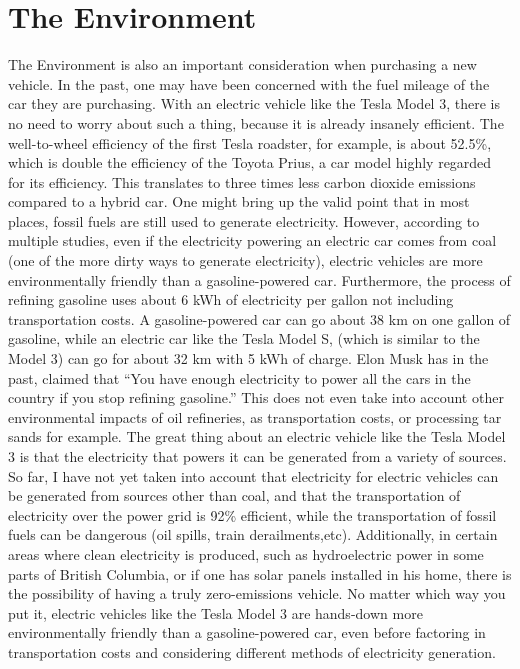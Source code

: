 \documentclass{IEEEtran}
\begin{document}
  \section{The Environment}
  The Environment is also an important consideration when purchasing a new vehicle.
  In the past, one may have been concerned with the fuel mileage of the car they are purchasing.
  With an electric vehicle like the Tesla Model 3, there is no need to worry about such a thing,
  because it is already insanely efficient. The well-to-wheel efficiency of the first Tesla roadster,
  for example, is about 52.5\%, which is double the efficiency of the Toyota Prius\cite{eberhard200621},
  a car model highly regarded for its efficiency. This translates to three times less carbon dioxide
  emissions compared to a hybrid car.\cite{eberhard200621} One might bring up the valid point that
  in most places, fossil fuels are still used to generate electricity. However, according to multiple
  studies, even if the electricity powering an electric car comes from coal
  (one of the more dirty ways to generate electricity),
  electric vehicles are more environmentally friendly than a gasoline-powered car.\cite{cleanerevenwithcoal}
  Furthermore, the process of refining gasoline uses about 6 kWh of electricity per gallon not including transportation costs.
  A gasoline-powered car can go about 38 km on one gallon of gasoline, while an electric car like the Tesla Model S,
  (which is similar to the Model 3) can go for about 32 km with 5 kWh of charge. Elon Musk has
  in the past, claimed that ``You have enough electricity to power all the cars
  in the country if you stop refining gasoline.''\cite{rosoff_elon_nodate}
  This does not even take into account other environmental impacts of oil refineries,
  as transportation costs, or processing tar sands for example.\cite{6kwh}
  The great thing about an electric vehicle like the Tesla Model 3 is that
  the electricity that powers it can be generated from a variety of sources.\cite{eberhard200621}
  So far, I have not yet taken into account that electricity for electric vehicles can be generated
  from sources other than coal, and that the transportation of electricity over the power grid is
  92\% efficient\cite{eberhard200621}, while the transportation of fossil fuels
  can be dangerous (oil spills, train derailments,etc). Additionally, in certain areas where clean electricity is produced, such
  as hydroelectric power in some parts of British Columbia, or if one has solar
  panels installed in his home, there is the possibility of having a truly zero-emissions vehicle.
  No matter which way you put it, electric vehicles like the Tesla Model 3 are hands-down
  more environmentally friendly than a gasoline-powered car, even before factoring in transportation
  costs and considering different methods of electricity generation.
\end{document}
